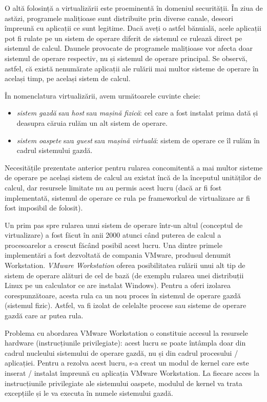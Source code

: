 O altă folosință a virtualizării este
proeminentă în domeniul securității. În ziua de astăzi, programele malițioase
sunt distribuite prin diverse canale, deseori împreună cu aplicații ce sunt
legitime. Dacă aveți o astfel bănuială, acele aplicații pot fi rulate pe un
sistem de operare diferit de sistemul ce rulează direct pe sistemul de calcul.
Daunele provocate de programele malițioase vor afecta doar sistemul de operare
respectiv, nu și sistemul de operare principal. Se observă, astfel, că există
nenumărate aplicații ale rulării mai multor sisteme de operare în același timp,
pe același sistem de calcul.

În nomenclatura virtualizării, avem următoarele cuvinte cheie:

\begin{itemize}
  \item \textit{sistem gazdă} sau \textit{host} sau \textit{mașină
    fizică}: cel care a fost instalat prima dată și deasupra căruia
    rulăm un alt sistem de operare.
  \item \textit{sistem oaspete} sau \textit{guest} sau \textit{mașină
    virtuală}: sistem de operare ce îl rulăm în cadrul sistemului
    gazdă.
\end{itemize}

Necesitățile prezentate anterior pentru rularea concomitentă a mai multor
sisteme de operare pe același sistem de calcul au existat încă de la începutul
unităților de calcul, dar resursele limitate nu au permis acest lucru (dacă ar
fi fost implementată, sistemul de operare ce rula pe frameworkul de virtualizare
ar fi fost imposibil de folosit).

Un prim pas spre rularea unui sistem de operare
într-un altul (conceptul de virtualizare) a fost făcut în anii 2000 atunci când
puterea de calcul a procesoarelor a crescut făcând posibil acest lucru. Una
dintre primele implementări a fost dezvoltată de compania VMware, produsul
denumit Workstation. \textit{VMware Workstation} oferea posibilitatea rulării
unui alt tip de sistem de operare alături de cel de bază (de exemplu rularea
unei distribuții Linux pe un calculator ce are instalat Windows). Pentru a oferi
izolarea corespunzătoare, acesta rula ca un nou proces în sistemul de operare
gazdă (sistemul fizic). Astfel, va fi izolat de celelalte procese sau sisteme de
operare gazdă care ar putea rula.

Problema cu abordarea VMware Workstation o constituie
accesul la resursele hardware (instrucțiunile privilegiate): acest lucru se
poate întâmpla doar din cadrul nucleului sistemului de operare gazdă, nu și din
cadrul procesului / aplicației. Pentru a rezolva acest lucru, s-a creat un modul de
kernel care este inserat / instalat împreună cu aplicația VMware Workstation. La
fiecare acces la instrucțiunile privilegiate ale sistemului oaspete, modulul de
kernel va trata excepțiile și le va executa în numele sistemului gazdă.

